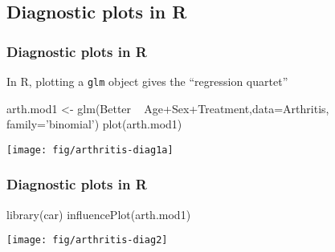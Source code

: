\subsection{Diagnostic plots in R}
\begin{frame}[fragile]
  \frametitle{Diagnostic plots in R}
In R, plotting a \texttt{glm} object gives the ``regression quartet''
\begin{Rin}[baselinestretch=0.8]
arth.mod1 <- glm(Better ~ Age+Sex+Treatment,data=Arthritis,
             family='binomial')
plot(arth.mod1) 
\end{Rin}

 \begin{center}
  \texttt{[image: fig/arthritis-diag1a]}
 \end{center}
\end{frame}

\begin{frame}[fragile]
  \frametitle{Diagnostic plots in R}
\begin{Rin}[baselinestretch=0.9]
library(car)
influencePlot(arth.mod1) 
\end{Rin}
 \begin{center}
  \texttt{[image: fig/arthritis-diag2]}
 \end{center}
\end{frame}
